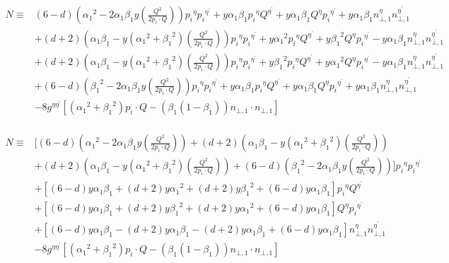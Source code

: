 \begin{equation}
\begin{split}
N\equiv&(6-d)({\alpha_1}^2 -2\alpha_1 \beta_1 y(\frac{Q^2}{2 p_i \cdot Q})){p_i}^{{\eta}}{p_i}^{{\eta}^{\prime}}+y\alpha_1 \beta_1 {p_i}^{{\eta}}{Q}^{{\eta}^{\prime}}+y\alpha_1 \beta_1 {Q}^{{\eta}}{p_i}^{{\eta}^{\prime}}+y\alpha_1\beta_1 {n}^{{\eta}}_{\bot,1}{n}^{{\eta}^{\prime}}_{\bot,1}\\
&+(d+2)({\alpha_1}\beta_1 -y({\alpha_1}^2 + {\beta_1}^2 )(\frac{Q^2}{2 p_i \cdot Q})){p_i}^{{\eta}}{p_i}^{{\eta}^{\prime}}+y{\alpha_1}^2 {p_i}^{{\eta}}{Q}^{{\eta}^{\prime}}+y{\beta_1}^2 {Q}^{{\eta}}{p_i}^{{\eta}^{\prime}}-y\alpha_1\beta_1 {n}^{{\eta}}_{\bot,1}{n}^{{\eta}^{\prime}}_{\bot,1}\\
&+(d+2)({\alpha_1}\beta_1 -y({\alpha_1}^2 + {\beta_1}^2 )(\frac{Q^2}{2 p_i \cdot Q})){p_i}^{{\eta}}{p_i}^{{\eta}^{\prime}}+y{\beta_1}^2 {p_i}^{{\eta}}{Q}^{{\eta}^{\prime}}+y{\alpha_1}^2 {Q}^{{\eta}}{p_i}^{{\eta}^{\prime}}-y\alpha_1\beta_1 {n}^{{\eta}}_{\bot,1}{n}^{{\eta}^{\prime}}_{\bot,1}\\
&+(6-d)({\beta_1}^2 -2\alpha_1 \beta_1 y(\frac{Q^2}{2 p_i \cdot Q})){p_i}^{{\eta}}{p_i}^{{\eta}^{\prime}}+y\alpha_1 \beta_1 {p_i}^{{\eta}}{Q}^{{\eta}^{\prime}}+y\alpha_1 \beta_1 {Q}^{{\eta}}{p_i}^{{\eta}^{\prime}}+y\alpha_1\beta_1 {n}^{{\eta}}_{\bot,1}{n}^{{\eta}^{\prime}}_{\bot,1}\\
&-8g^{{\eta}{{\eta}^{\prime}}}[({\alpha_1}^2+{\beta_1}^2) p_i \cdot Q - ({\beta_1}(1-\beta_1)){n}_{\bot,1}\cdot{n}_{\bot,1}]\\
\end{split}
\end{equation}

\begin{equation}
\begin{split}
N\equiv&[(6-d)({\alpha_1}^2 -2\alpha_1 \beta_1 y(\frac{Q^2}{2 p_i \cdot Q}))+(d+2)({\alpha_1}\beta_1 -y({\alpha_1}^2 + {\beta_1}^2 )(\frac{Q^2}{2 p_i \cdot Q}))\\&+(d+2)({\alpha_1}\beta_1 -y({\alpha_1}^2 + {\beta_1}^2 )(\frac{Q^2}{2 p_i \cdot Q}))+(6-d)({\beta_1}^2 -2\alpha_1 \beta_1 y(\frac{Q^2}{2 p_i \cdot Q}))]{p_i}^{{\eta}}{p_i}^{{\eta}^{\prime}}\\
&+[(6-d)y\alpha_1 \beta_1+(d+2)y{\alpha_1}^2+(d+2)y{\beta_1}^2+(6-d)y\alpha_1 \beta_1] {p_i}^{{\eta}}{Q}^{{\eta}^{\prime}}\\
&+[(6-d)y\alpha_1 \beta_1 +(d+2)y{\beta_1}^2+(d+2)y{\alpha_1}^2+(6-d)y\alpha_1 \beta_1] {Q}^{{\eta}}{p_i}^{{\eta}^{\prime}}\\
&+[(6-d)y\alpha_1\beta_1-(d+2)y\alpha_1\beta_1-(d+2)y\alpha_1\beta_1+(6-d)y\alpha_1\beta_1] {n}^{{\eta}}_{\bot,1}{n}^{{\eta}^{\prime}}_{\bot,1}\\
&-8g^{{\eta}{{\eta}^{\prime}}}[({\alpha_1}^2+{\beta_1}^2) p_i \cdot Q - ({\beta_1}(1-\beta_1)){n}_{\bot,1}\cdot{n}_{\bot,1}]\\
\end{split}
\end{equation}

